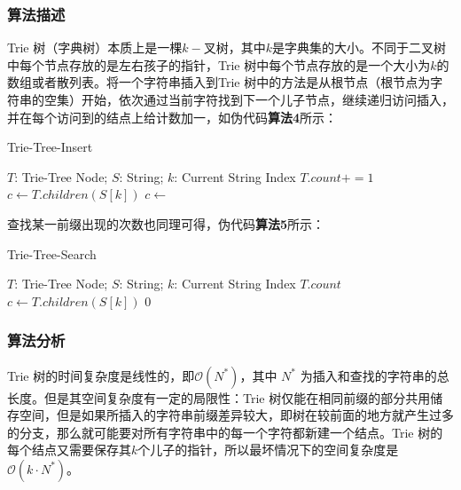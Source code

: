 \documentclass[UTF8]{ctexart}
\begin{document}
\subsubsection {算法描述}

Trie 树（字典树）本质上是一棵$k-$叉树，其中$k$是字典集的大小。不同于二叉树中每个节点存放的是左右孩子的指针，Trie 树中每个节点存放的是一个大小为$k$的数组或者散列表。将一个字符串插入到Trie 树中的方法是从根节点（根节点为字符串的空集）开始，依次通过当前字符找到下一个儿子节点，继续递归访问插入，并在每个访问到的结点上给计数加一，如伪代码\textbf{算法4}所示：

\begin{algorithm}
\caption{Trie-Tree-Insert}  
\label{alg:Trie Tree Insert Algorithm} 
\begin{algorithmic} [1] 
	\Require $T$: Trie-Tree Node; $S$: String; $k$: Current String Index
	\State $T.count += 1$
				\State \Return
		\EndIf
		\State $c \gets T.children(S[k])$
				\State $c \gets $ 
		\EndIf
		\State {}
	\EndFunction  
\end{algorithmic}
\end{algorithm}

查找某一前缀出现的次数也同理可得，伪代码\textbf{算法5}所示：

\begin{algorithm}
\caption{Trie-Tree-Search}  
\label{alg:Trie Tree Search Algorithm} 
\begin{algorithmic} [1] 
	\Require $T$: Trie-Tree Node; $S$: String; $k$: Current String Index
				\State \Return $T.count$
		\EndIf
		\State $c \gets T.children(S[k])$
				\State \Return $0$
		\EndIf
		\State {}
	\EndFunction  
\end{algorithmic}
\end{algorithm}

\subsubsection {算法分析}

Trie 树的时间复杂度是线性的，即$\mathcal{O}(N^*)$，其中 $N^*$ 为插入和查找的字符串的总长度。但是其空间复杂度有一定的局限性：Trie 树仅能在相同前缀的部分共用储存空间，但是如果所插入的字符串前缀差异较大，即树在较前面的地方就产生过多的分支，那么就可能要对所有字符串中的每一个字符都新建一个结点。Trie 树的每个结点又需要保存其$k$个儿子的指针，所以最坏情况下的空间复杂度是$\mathcal{O}(k \cdot N^*)$。
\end{document}
